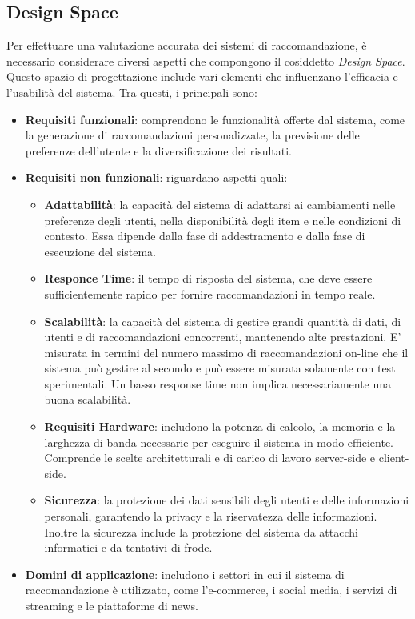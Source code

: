 \documentclass{report}
\begin{document}
	\subsection{Design Space}
	Per effettuare una valutazione accurata dei sistemi di raccomandazione, è necessario considerare diversi aspetti che compongono il cosiddetto \textit{Design Space}. Questo spazio di progettazione include vari elementi che influenzano l'efficacia e l'usabilità del sistema. Tra questi, i principali sono:
	\begin{itemize}
		\item \textbf{Requisiti funzionali}: comprendono le funzionalità offerte dal sistema, come la generazione di raccomandazioni personalizzate, la previsione delle preferenze dell'utente e la diversificazione dei risultati.
		\item \textbf{Requisiti non funzionali}: riguardano aspetti quali:
		\begin{itemize}
			\item \textbf{Adattabilità}: la capacità del sistema di adattarsi ai cambiamenti nelle preferenze degli utenti, nella disponibilità degli item e nelle condizioni di contesto. Essa dipende dalla fase di addestramento e dalla fase di esecuzione del sistema.
			\item \textbf{Responce Time}: il tempo di risposta del sistema, che deve essere sufficientemente rapido per fornire raccomandazioni in tempo reale.
			\item \textbf{Scalabilità}: la capacità del sistema di gestire grandi quantità di dati, di utenti e di raccomandazioni concorrenti, mantenendo alte prestazioni. E' misurata in termini del numero massimo di raccomandazioni on-line che il sistema può gestire al secondo e può essere misurata solamente con test sperimentali. Un basso response time non implica necessariamente una buona scalabilità.
			\item \textbf{Requisiti Hardware}: includono la potenza di calcolo, la memoria e la larghezza di banda necessarie per eseguire il sistema in modo efficiente. Comprende le scelte architetturali e di carico di lavoro server-side e client-side.
			\item \textbf{Sicurezza}: la protezione dei dati sensibili degli utenti e delle informazioni personali, garantendo la privacy e la riservatezza delle informazioni. Inoltre la sicurezza include la protezione del sistema da attacchi informatici e da tentativi di frode.
		\end{itemize}
		\item \textbf{Domini di applicazione}: includono i settori in cui il sistema di raccomandazione è utilizzato, come l'e-commerce, i social media, i servizi di streaming e le piattaforme di news.
	\end{itemize}
\end{document}

